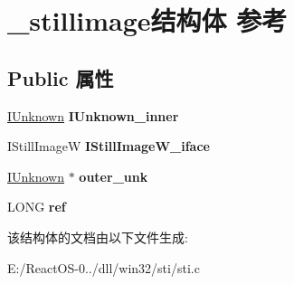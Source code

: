 \hypertarget{struct__stillimage}{}\section{\+\_\+stillimage结构体 参考}
\label{struct__stillimage}
\subsection*{Public 属性}
\begin{DoxyCompactItemize}
\item 
\mbox{\label{struct__stillimage_a3820c29a67d2e9c62866e50ff2aa5241}} 
\hyperlink{interface_i_unknown}{I\+Unknown} {\bfseries I\+Unknown\+\_\+inner}
\item 
\mbox{\label{struct__stillimage_aac8ee5374cdc86f4ad674a10be1fdd88}} 
I\+Still\+ImageW {\bfseries I\+Still\+Image\+W\+\_\+iface}
\item 
\mbox{\label{struct__stillimage_afb5b498b15730a127d9314b9ed6065e4}} 
\hyperlink{interface_i_unknown}{I\+Unknown} $\ast$ {\bfseries outer\+\_\+unk}
\item 
\mbox{\label{struct__stillimage_ac5c644d8eb0586d06fea591223dedf53}} 
L\+O\+NG {\bfseries ref}
\end{DoxyCompactItemize}


该结构体的文档由以下文件生成\+:\begin{DoxyCompactItemize}
\item 
E\+:/\+React\+O\+S-\/0../dll/win32/sti/sti.\+c\end{DoxyCompactItemize}
